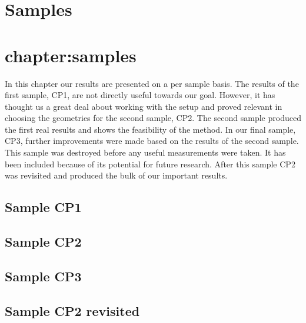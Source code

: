 \chapter{Samples}
\chapter{chapter:samples}
In this chapter our results are presented on a per sample basis. The results of the first sample, CP1, are not directly useful towards our goal. However, it has thought us a great deal about working with the setup and proved relevant in choosing the geometries for the second sample, CP2. The second sample produced the first real results and shows the feasibility of the method. In our final sample, CP3, further improvements were made based on the results of the second sample. This sample was destroyed before any useful measurements were taken. It has been included because of its potential for future research. After this sample CP2 was revisited and produced the bulk of our important results.

\section{Sample CP1}


\newpage
\section{Sample CP2}


\newpage
\section{Sample CP3}


\newpage
\section{Sample CP2 revisited}
